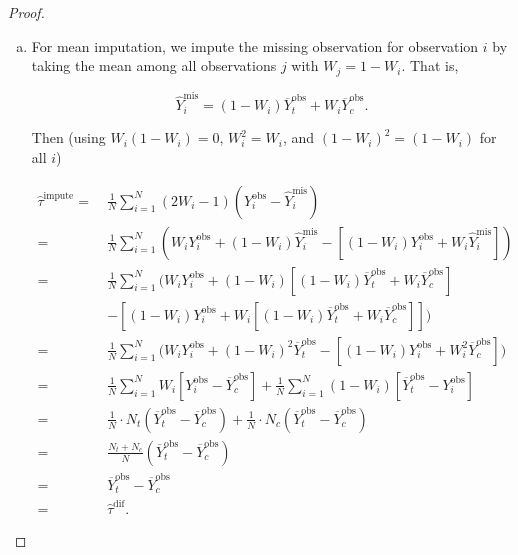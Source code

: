 \begin{proof}

\begin{enumerate}[(a)]

\item

For mean imputation, we impute the missing observation for observation \(i\) by taking the mean among all observations \(j\) with \(W_j = 1 - W_i\). That is,



\[
\hat{Y}_i^{\text{mis}} =  \left(1-W_i \right) \overline{Y}_t^{\text{obs}}  + W_i \overline{Y}_c^{\text{obs}} .
\]

Then (using \(W_i(1 - W_i) = 0\), \(W_i^2 = W_i\), and \((1 - W_i)^2 = (1 - W_i)\) for all \(i\))

\begin{align*}
\hat{\tau}^{\text{impute}} = ~ &  \frac{1}{N} \sum_{i=1}^N (2W_i - 1)(Y_i^{\text{obs}} - \hat{Y}_i^{\text{mis}})
\\ = ~ &  \frac{1}{N} \sum_{i=1}^N \left( W_i Y_i^{\text{obs}} + (1 - W_i) \hat{Y}_i^{\text{mis}}  - \left[ (1 - W_i) Y_i^{\text{obs}} + W_i \hat{Y}_i^{\text{mis}} \right] \right)
\\ = ~ &  \frac{1}{N} \sum_{i=1}^N \Big( W_i Y_i^{\text{obs}} + (1 - W_i) \left[  \left(1-W_i \right) \overline{Y}_t^{\text{obs}}  + W_i \overline{Y}_c^{\text{obs}} \right]  
\\ & - \left[ (1 - W_i) Y_i^{\text{obs}} + W_i \left[  \left(1-W_i \right) \overline{Y}_t^{\text{obs}}  + W_i \overline{Y}_c^{\text{obs}} \right] \right] \Big)
\\ = ~ &  \frac{1}{N} \sum_{i=1}^N \Big( W_i Y_i^{\text{obs}} + (1 - W_i)^2  \overline{Y}_t^{\text{obs}}  
 - \left[ (1 - W_i) Y_i^{\text{obs}} + W_i^2 \overline{Y}_c^{\text{obs}}  \right] \Big)
 \\ = ~ &  \frac{1}{N} \sum_{i=1}^N  W_i \left[ Y_i^{\text{obs}} -  \overline{Y}_c^{\text{obs}} \right] + \frac{1}{N} \sum_{i=1}^N (1 - W_i)  \left[ \overline{Y}_t^{\text{obs}}   - Y_i^{\text{obs}} \right] 
  \\ = ~ &  \frac{1}{N} \cdot N_t \left( \overline{Y}_t^{\text{obs}}  -   \overline{Y}_c^{\text{obs}} \right)  + \frac{1}{N} \cdot N_c  \left( \overline{Y}_t^{\text{obs}}   -  \overline{Y}_c^{\text{obs}}  \right)
\\ = ~ &  \frac{N_t + N_c }{N} \left( \overline{Y}_t^{\text{obs}}  -   \overline{Y}_c^{\text{obs}} \right) 
\\ = ~ &  \overline{Y}_t^{\text{obs}} - \overline{Y}_c^{\text{obs}} 
\\ = ~ & \hat{\tau}^{\text{dif}}.
\end{align*}



\end{enumerate}
\end{proof}
